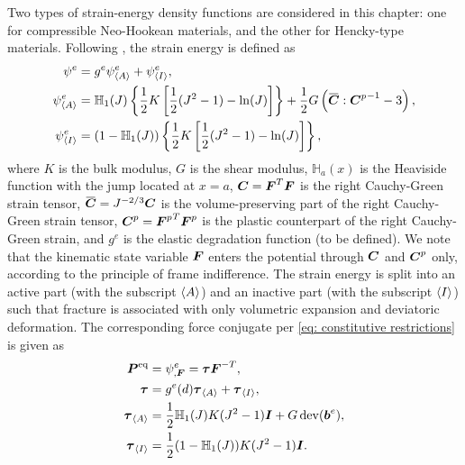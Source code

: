 Two types of strain-energy density functions are considered in this chapter: one for compressible Neo-Hookean materials, and the other for Hencky-type materials.
Following \cite{borden2016phase,ambati2016phase}, the strain energy is defined as
\begin{subequations}
  \begin{align}
    \psi^e               & =  g^e \psi^e_\activepart + \psi^e_\inactivepart,                                                                                                          \\
    \psi^e_\activepart   & = \mathbb{H}_1(J)\left\{ \dfrac{1}{2}K\left[ \dfrac{1}{2}(J^2-1) - \ln(J) \right] \right\} + \dfrac{1}{2}G\left( \overbar{\bfC}:{\bfC^p}^{-1} - 3 \right), \\
    \psi^e_\inactivepart & = \left( 1-\mathbb{H}_1(J) \right) \left\{ \dfrac{1}{2}K\left[ \dfrac{1}{2}(J^2-1) - \ln(J) \right] \right\},                                              
  \end{align}
\end{subequations}
where $K$ is the bulk modulus, $G$ is the shear modulus, $\mathbb{H}_a(x)$ is the Heaviside function with the jump located at $x = a$, $\boldsymbol{C} = \boldsymbol{F}^T \boldsymbol{F}$ is the right Cauchy-Green strain tensor, $\overbar{\bfC} = J^{-2/3}\bfC$ is the volume-preserving part of the right Cauchy-Green strain tensor, $\boldsymbol{C}^p = {\boldsymbol{F}^p}^T \boldsymbol{F}^p$ is the plastic counterpart of the right Cauchy-Green strain, and $g^e$ is the elastic degradation function (to be defined). We note that the kinematic state variable $\boldsymbol{F}$ enters the potential through $\boldsymbol{C}$ and $\boldsymbol{C}^p$ only, according to the principle of frame indifference.
The strain energy is split into an active part (with the subscript ${\left< A \right>}$) and an inactive part (with the subscript ${\left< I \right>}$) such that fracture is associated with only volumetric expansion and deviatoric deformation. The corresponding force conjugate per \eqref{eq: constitutive restrictions} is given as
\begin{subequations}
  \begin{align}
    \boldsymbol{P}^\text{eq}          & = \psi^e_{, \boldsymbol{F}} = \boldsymbol{\tau}\boldsymbol{F}^{-T},                \\
    \boldsymbol{\tau}               & = g^e(d)\boldsymbol{\tau}_{\left< A \right>} + \boldsymbol{\tau}_{\left< I \right>},       \\
    \boldsymbol{\tau}_{\left< A \right>}   & = \dfrac{1}{2}\mathbb{H}_1(J)K(J^2-1)\boldsymbol{I} + G\operatorname{dev}(\boldsymbol{b}^e), \\
    \boldsymbol{\tau}_{\left< I \right>} & = \dfrac{1}{2}(1-\mathbb{H}_1(J))K(J^2-1)\boldsymbol{I}.               
  \end{align}
\end{subequations}

